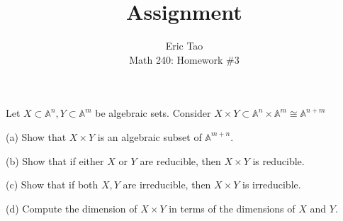 \documentclass[10pt]{article}
\newenvironment{problem}[2][Problem]{\begin{trivlist}
\item[\hskip \labelsep {\bfseries #1}\hskip \labelsep {\bfseries #2.}]}{\end{trivlist}}
\begin{document}
 
\title{Assignment}
\author{Eric Tao\\
Math 240: Homework \#3}
\maketitle
 
\begin{problem}{3.1}

Let $X \subset \mathbb{A}^n, Y \subset \mathbb{A}^m$ be algebraic sets. Consider $X \times Y \subset \mathbb{A}^n \times \mathbb{A}^m \cong \mathbb{A}^{n+m}$

(a) Show that $X \times Y$ is an algebraic subset of $\mathbb{A}^{m+n}$.

(b) Show that if either $X$ or $Y$ are reducible, then $X \times Y$ is reducible.

(c) Show that if both $X,Y$ are irreducible, then $X \times Y$ is irreducible.

(d) Compute the dimension of $X \times Y$ in terms of the dimensions of $X$ and $Y$.

\end{problem}
\end{document}
